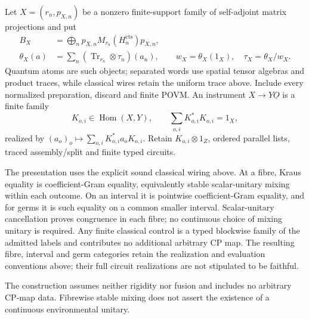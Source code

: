 \begin{definition}
Let $X=(r_n,p_{X,n})$ be a nonzero finite-support family of self-adjoint
matrix projections and put
\[
 \begin{aligned}
 B_X&=\bigoplus_n p_{X,n}M_{r_n}(H_n^{\mathrm{cts}})p_{X,n},\\
 \theta_X(a)&=\sum_n(\operatorname{Tr}_{r_n}\otimes\tau_n)(a_n),\qquad
 w_X=\theta_X(1_X),\quad \tau_X=\theta_X/w_X.
 \end{aligned}
\]
Quantum atoms are such objects; separated words use
spatial tensor algebras and product traces, while classical wires retain the
uniform trace above.  Include every normalized preparation, discard and
finite POVM.  An instrument $X\to Y\underline O$ is a finite family
\[
 K_{o,i}\in\operatorname{Hom}(X,Y),\qquad
 \sum_{o,i}K_{o,i}^*K_{o,i}=1_X,
\]
realized by $(a_o)_o\mapsto\sum_{o,i}K_{o,i}^*a_oK_{o,i}$.  Retain
$K_{o,i}\otimes1_Z$, ordered parallel lists, traced assembly/split and finite
typed circuits.

The presentation uses the explicit sound classical wiring above.  At a fibre,
Kraus equality is coefficient-Gram equality, equivalently stable
scalar-unitary mixing within each outcome.  On an interval it is pointwise
coefficient-Gram equality, and for germs it is such equality on a common
smaller interval. Scalar-unitary cancellation proves congruence in each fibre; no continuous
choice of mixing unitary is required.  Any finite classical control is a
typed blockwise family of the admitted labels and contributes no additional
arbitrary CP map.  The resulting fibre, interval and germ categories retain
the realization and evaluation conventions above; their full circuit
realizations are not stipulated to be faithful.
\end{definition}
\begin{scope}
The construction assumes neither rigidity nor fusion and includes no
arbitrary CP-map data.  Fibrewise stable mixing does not assert the existence
of a continuous environmental unitary.
\end{scope}

